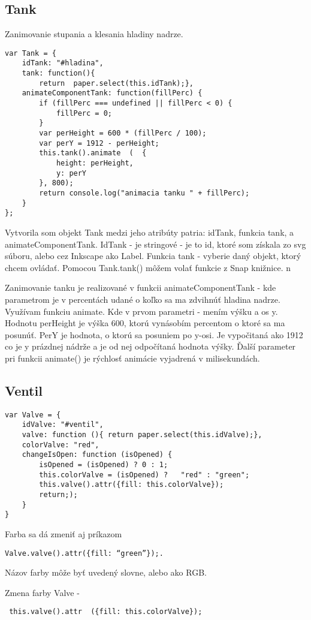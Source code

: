 \subsection{Tank}
Zanimovanie stupania a klesania hladiny nadrze. 
\begin{lstlisting}
var Tank = {
	idTank: "#hladina",
	tank: function(){
		return  paper.select(this.idTank);},
	animateComponentTank: function(fillPerc) {
		if (fillPerc === undefined || fillPerc < 0) {
			fillPerc = 0;
		}
		var perHeight = 600 * (fillPerc / 100);
		var perY = 1912 - perHeight;
		this.tank().animate  (	{
			height: perHeight,
			y: perY
		}, 800);
		return console.log("animacia tanku " + fillPerc);
	}
};
\end{lstlisting}

Vytvorila som objekt Tank medzi jeho atribúty patria: idTank, funkcia tank, a animateComponentTank. IdTank - je stringové - je to id, ktoré som získala zo svg súboru, alebo cez Inkscape ako Label. Funkcia tank - vyberie daný objekt, ktorý chcem ovládať. Pomocou Tank.tank() môžem volať funkcie z Snap knižnice. n 

Zanimovanie tanku je realizované v funkcii animateComponentTank - kde parametrom je v percentách udané o koľko sa ma zdvihnúť hladina nadrze. 
Využívam funkciu animate. Kde v prvom parametri - mením výšku a os y. Hodnotu perHeight je výška 600, ktorú vynásobím percentom o ktoré sa ma posunúť. PerY je hodnota, o ktorú sa posuniem po y-osi. Je vypočitaná ako 1912 co je y prázdnej nádrže a je od nej odpočítaná hodnota výšky. 
Ďalší parameter pri funkcii animate() je rýchlosť animácie vyjadrená v milisekundách.

\subsection{Ventil}

\begin{lstlisting}
var Valve = {
	idValve: "#ventil",
	valve: function (){ return paper.select(this.idValve);},
	colorValve: "red",
	changeIsOpen: function (isOpened) {
		isOpened = (isOpened) ? 0 : 1;
		this.colorValve = (isOpened) ?   "red" : "green";
		this.valve().attr({fill: this.colorValve});
		return;);
	}
}
\end{lstlisting}

Farba sa dá zmeniť aj príkazom 

\begin{verbatim}
Valve.valve().attr({fill: “green”});.
\end{verbatim}

Názov farby môže byť uvedený slovne, alebo ako RGB. 

Zmena farby Valve - \begin{verbatim} this.valve().attr  ({fill: this.colorValve}); \end{verbatim}

